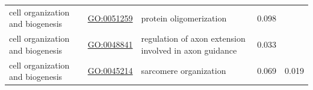 \documentclass[
]{article}
\begin{document}
\begin{longtable}[]{@{}lllll@{}}
\begin{minipage}[t]{0.17\columnwidth}\raggedright
cell organization and biogenesis\strut
\end{minipage} & \begin{minipage}[t]{0.17\columnwidth}\raggedright
\url{GO:0051259}\strut
\end{minipage} & \begin{minipage}[t]{0.17\columnwidth}\raggedright
protein oligomerization\strut
\end{minipage} & \begin{minipage}[t]{0.17\columnwidth}\raggedright
0.098\strut
\end{minipage} & \begin{minipage}[t]{0.17\columnwidth}\raggedright
\strut
\end{minipage}\tabularnewline
\begin{minipage}[t]{0.17\columnwidth}\raggedright
cell organization and biogenesis\strut
\end{minipage} & \begin{minipage}[t]{0.17\columnwidth}\raggedright
\url{GO:0048841}\strut
\end{minipage} & \begin{minipage}[t]{0.17\columnwidth}\raggedright
regulation of axon extension involved in axon guidance\strut
\end{minipage} & \begin{minipage}[t]{0.17\columnwidth}\raggedright
0.033\strut
\end{minipage} & \begin{minipage}[t]{0.17\columnwidth}\raggedright
\strut
\end{minipage}\tabularnewline
\begin{minipage}[t]{0.17\columnwidth}\raggedright
cell organization and biogenesis\strut
\end{minipage} & \begin{minipage}[t]{0.17\columnwidth}\raggedright
\url{GO:0045214}\strut
\end{minipage} & \begin{minipage}[t]{0.17\columnwidth}\raggedright
sarcomere organization\strut
\end{minipage} & \begin{minipage}[t]{0.17\columnwidth}\raggedright
0.069\strut
\end{minipage} & \begin{minipage}[t]{0.17\columnwidth}\raggedright
0.019\strut
\end{minipage}\tabularnewline

\end{longtable}
\end{document}

